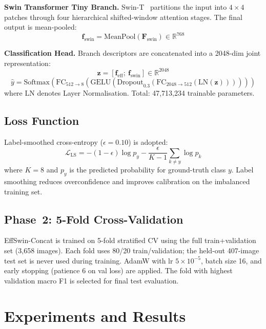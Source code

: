 \documentclass[conference]{IEEEtran}
\begin{document}
\textbf{Swin Transformer Tiny Branch.} Swin-T~\cite{b4} partitions the input into $4\times4$ patches through four hierarchical shifted-window attention stages. The final output is mean-pooled:
\begin{equation}
\mathbf{f}_{\text{swin}}=\text{MeanPool}(\mathbf{F}_{\text{swin}})\in\mathbb{R}^{768}
\end{equation}

\textbf{Classification Head.} Branch descriptors are concatenated into a 2048-dim joint representation:
\begin{equation}
\mathbf{z}=[\mathbf{f}_{\text{eff}};\ \mathbf{f}_{\text{swin}}]\in\mathbb{R}^{2048}
\end{equation}
\begin{equation}
\hat{y}=\text{Softmax}\!\left(\text{FC}_{512\to8}\!\left(\text{GELU}\!\left(\text{Dropout}_{0.3}\!\left(\text{FC}_{2048\to512}(\text{LN}(\mathbf{z}))\right)\right)\right)\right)
\end{equation}
where LN denotes Layer Normalisation. Total: 47,713,234 trainable parameters.

\subsection{Loss Function}
Label-smoothed cross-entropy ($\epsilon{=}0.10$) is adopted:
\begin{equation}
\mathcal{L}_{\text{LS}}=-(1-\epsilon)\log p_{y}-\frac{\epsilon}{K-1}\sum_{k\neq y}\log p_k
\end{equation}
where $K{=}8$ and $p_y$ is the predicted probability for ground-truth class $y$. Label smoothing reduces overconfidence and improves calibration on the imbalanced training set.

\subsection{Phase~2: 5-Fold Cross-Validation}
EffSwin-Concat is trained on 5-fold stratified CV using the full train+validation set (3,658 images). Each fold uses 80/20 train/validation; the held-out 407-image test set is never used during training. AdamW with lr $5\times10^{-5}$, batch size 16, and early stopping (patience 6 on val loss) are applied. The fold with highest validation macro F1 is selected for final test evaluation.

\section{Experiments and Results}
\label{sec:exp}
\end{document}
